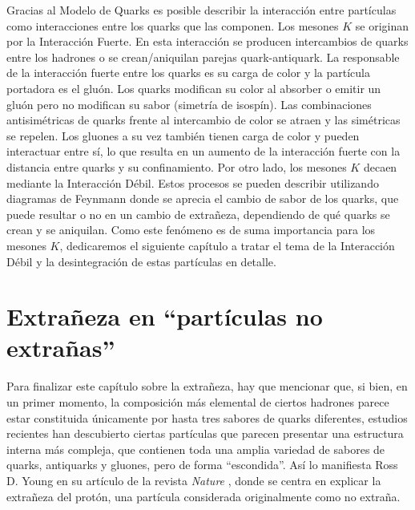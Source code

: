 Gracias al Modelo de Quarks es posible describir la interacción entre partículas como interacciones entre los quarks que las componen. Los mesones $K$ se originan por la Interacción Fuerte. En esta interacción se producen intercambios de quarks entre los hadrones o se crean/aniquilan parejas quark-antiquark. La responsable de la interacción fuerte entre los quarks es su carga de color y la partícula portadora es el gluón.  Los quarks modifican su color al absorber o emitir un gluón pero no modifican su sabor (simetría de isospín). Las combinaciones antisimétricas de quarks frente al intercambio de color se atraen y las simétricas se repelen. Los gluones a su vez también tienen carga de color y pueden interactuar entre sí, lo que resulta en un aumento de la interacción fuerte con la distancia entre quarks y su confinamiento.\cite{notas2020} Por otro lado, los mesones $K$ decaen mediante la Interacción Débil. Estos procesos se pueden describir utilizando diagramas de Feynmann donde se aprecia el cambio de sabor de los quarks, que puede resultar o no en un cambio de extrañeza, dependiendo de qué quarks se crean y se aniquilan. Como este fenómeno es de suma importancia para los mesones $K$, dedicaremos el siguiente capítulo a tratar el tema de la Interacción Débil y la desintegración de estas partículas en detalle.\\



\section{Extrañeza en ``partículas no extrañas''}
\label{cap:non-strange_particles}
\vspace{5mm}

Para finalizar este capítulo sobre la extrañeza, hay que mencionar que, si bien, en un primer momento, la composición más elemental de ciertos hadrones parece estar constituida únicamente por hasta tres sabores de quarks diferentes, estudios recientes han descubierto ciertas partículas que parecen presentar una estructura interna más compleja, que contienen toda una amplia variedad de sabores de quarks, antiquarks y gluones, pero de forma ``escondida''. Así lo manifiesta Ross D. Young en su artículo de la revista \textit{Nature} \cite{protonYoung}, donde se centra en explicar la extrañeza del protón, una partícula considerada originalmente como no extraña. 


